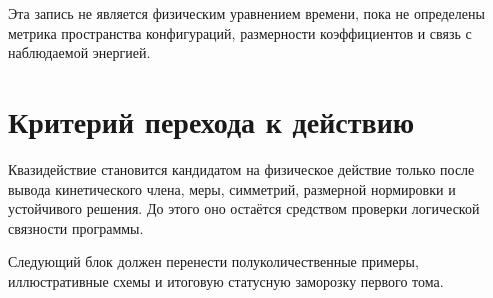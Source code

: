 Эта запись не является физическим уравнением времени, пока не определены
метрика пространства конфигураций, размерности коэффициентов и связь с
наблюдаемой энергией.

\section{Критерий перехода к действию}

Квазидействие становится кандидатом на физическое действие только после
вывода кинетического члена, меры, симметрий, размерной нормировки и устойчивого
решения. До этого оно остаётся средством проверки логической связности
программы.

Следующий блок должен перенести полуколичественные примеры, иллюстративные
схемы и итоговую статусную заморозку первого тома.